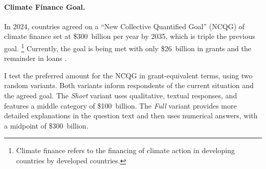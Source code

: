 \documentclass[12pt,english]{article}
\begin{document}
\begin{bibunit}


\paragraph{Climate Finance Goal.}\label{par:ncqg}

In 2024, countries agreed on a ``New Collective Quantified Goal'' (NCQG) of climate finance set at \$300~billion per year by 2035, which is triple the previous goal.
\footnote{Climate finance refers to the financing of climate action in developing countries by developed countries. } %
Currently, the goal is being met with only \$26~billion in grants and the remainder in loans \citep{oecd_climate_2024}. 

I test the preferred amount for the NCQG in grant-equivalent terms, using two random variants. Both variants inform respondents of the current situation and the agreed goal. %
The \textit{Short} variant uses qualitative, textual responses, and features a middle category of \$100~billion. %
The \textit{Full} variant provides more detailed explanations in the question text and then uses numerical answers, with a midpoint of \$300~billion. 


\end{bibunit}
\end{document}
